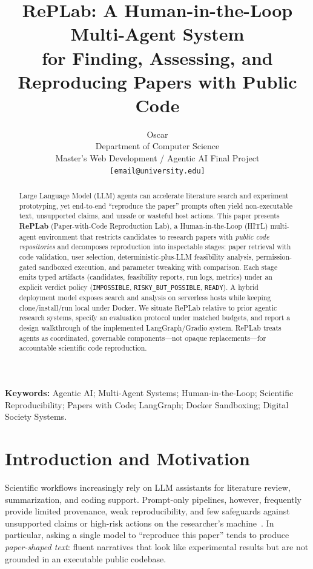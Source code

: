 \documentclass[11pt,a4paper]{article}
\title{\textbf{RePLab:} A Human-in-the-Loop Multi-Agent System\\
for Finding, Assessing, and Reproducing Papers with Public Code}
\author{
  Oscar\\
  Department of Computer Science\\
  Master's Web Development / Agentic AI Final Project\\
  \texttt{[email@university.edu]}
}
\date{}
\begin{document}
\maketitle

\begin{abstract}
Large Language Model (LLM) agents can accelerate literature search and experiment
prototyping, yet end-to-end ``reproduce the paper'' prompts often yield
non-executable text, unsupported claims, and unsafe or wasteful host actions.
This paper presents \textbf{RePLab} (Paper-with-Code Reproduction Lab), a
Human-in-the-Loop (HITL) multi-agent environment that restricts candidates to
research papers with \emph{public code repositories} and decomposes reproduction
into inspectable stages: paper retrieval with code validation, user selection,
deterministic-plus-LLM feasibility analysis, permission-gated sandboxed
execution, and parameter tweaking with comparison. Each stage emits typed
artifacts (candidates, feasibility reports, run logs, metrics) under an explicit
verdict policy (\texttt{IMPOSSIBLE}, \texttt{RISKY\_BUT\_POSSIBLE}, \texttt{READY}).
A hybrid deployment model exposes search and analysis on serverless hosts while
keeping clone/install/run local under Docker. We situate RePLab relative to
prior agentic research systems, specify an evaluation protocol under matched
budgets, and report a design walkthrough of the implemented LangGraph/Gradio
system. RePLab treats agents as coordinated, governable components---not opaque
replacements---for accountable scientific code reproduction.
\end{abstract}

\noindent\textbf{Keywords:}
Agentic AI; Multi-Agent Systems; Human-in-the-Loop; Scientific Reproducibility;
Papers with Code; LangGraph; Docker Sandboxing; Digital Society Systems.

\section{Introduction and Motivation}
\label{sec:intro}

Scientific workflows increasingly rely on LLM assistants for literature review,
summarization, and coding support. Prompt-only pipelines, however, frequently
provide limited provenance, weak reproducibility, and few safeguards against
unsupported claims or high-risk actions on the researcher's machine~\cite{chains2026,react}.
In particular, asking a single model to ``reproduce this paper'' tends to
produce \emph{paper-shaped text}: fluent narratives that look like experimental
results but are not grounded in an executable public codebase.
\end{document}
